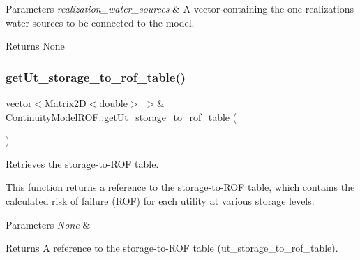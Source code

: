 \begin{DoxyParams}{Parameters}
{\em realization\+\_\+water\+\_\+sources} & A vector containing the one realization\textquotesingle{}s water sources to be connected to the model.\\
\hline
\end{DoxyParams}
\begin{DoxyReturn}{Returns}
None 
\end{DoxyReturn}
\mbox{\label{classContinuityModelROF_ad798adad5127a2674c5d4a3e8f24302d}} 
\subsubsection{\texorpdfstring{get\+Ut\+\_\+storage\+\_\+to\+\_\+rof\+\_\+table()}{getUt\_storage\_to\_rof\_table()}}
{\footnotesize\ttfamily vector$<$Matrix2D$<$double$>$ $>$\& Continuity\+Model\+R\+O\+F\+::get\+Ut\+\_\+storage\+\_\+to\+\_\+rof\+\_\+table (\begin{DoxyParamCaption}{ }\end{DoxyParamCaption})}



Retrieves the storage-\/to-\/\+R\+OF table. 

This function returns a reference to the storage-\/to-\/\+R\+OF table, which contains the calculated risk of failure (R\+OF) for each utility at various storage levels.


\begin{DoxyParams}{Parameters}
{\em None} & \\
\hline
\end{DoxyParams}
\begin{DoxyReturn}{Returns}
A reference to the storage-\/to-\/\+R\+OF table ({\ttfamily ut\+\_\+storage\+\_\+to\+\_\+rof\+\_\+table}). 
\end{DoxyReturn}
\mbox{\label{classContinuityModelROF_a1bb8362ce39e694937a787805613e106}} 
